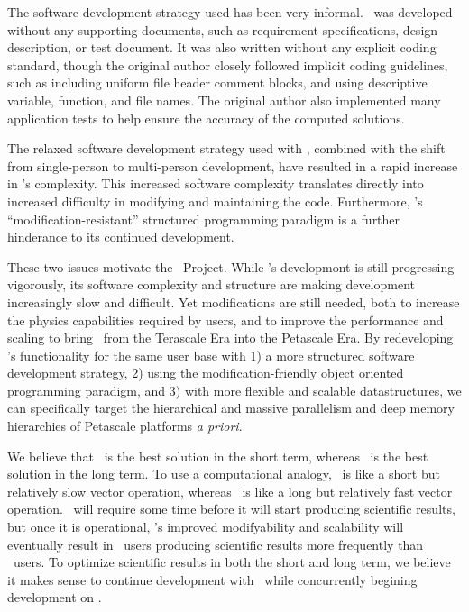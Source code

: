 \documentclass[11pt]{article}
\begin{document}
    The software development strategy used has been very informal.
    \enzo\ was developed without any supporting documents, such as
    requirement specifications, design description, or test document.
    It was also written without any explicit coding standard, though
    the original author closely followed implicit coding guidelines,
    such as including uniform file header comment blocks, and using
    descriptive variable, function, and file names.  The original
    author also implemented many application tests to help ensure the
    accuracy of the computed solutions.  

    The relaxed software development strategy used with \enzo,
    combined with the shift from single-person to multi-person
    development, have resulted in a rapid increase in \enzo's
    complexity.  This increased software complexity translates
    directly into increased difficulty in modifying and maintaining
    the code.  Furthermore, \enzo's ``modification-resistant''
    structured programming paradigm is a further hinderance to
    its continued development.
    


    These two issues motivate the \cello\ Project.  While \enzo's
    developmont is still progressing vigorously, its software
    complexity and structure are making development increasingly slow
    and difficult.  Yet modifications are still needed, both to
    increase the physics capabilities required by users, and to
    improve the performance and scaling to bring \enzo\ from the
    Terascale Era into the Petascale Era.  By redeveloping \enzo's
    functionality for the same user base with 1) a more structured
    software development strategy, 2) using the modification-friendly
    object oriented programming paradigm, and 3) with more flexible
    and scalable datastructures, we can specifically target the
    hierarchical and massive parallelism and deep memory hierarchies
    of Petascale platforms \textit{a priori}.


    We believe that \enzo\ is the best solution in the short term,
    whereas \cello\ is the best solution in the long term.  To use a
    computational analogy, \enzo\ is like a short but relatively slow
    vector operation, whereas \cello\ is like a long but relatively
    fast vector operation.  \cello\ will require some time before it
    will start producing scientific results, but once it is
    operational, \cello's improved modifyability and scalability will
    eventually result in \cello\ users producing scientific results
    more frequently than \enzo\ users.  To optimize scientific results
    in both the short and long term, we believe it makes sense to
    continue development with \enzo\ while concurrently begining
    development on \cello.
  
\end{document}
